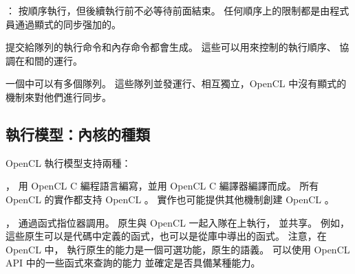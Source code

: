 \item {}：
按順序執行，但後續執行前不必等待前面結束。
任何順序上的限制都是由程式員通過顯式的同步强加的。
\stopigBase

提交給隊列的執行命令和內存命令都會生成。
這些可以用來控制的執行順序、
協調在和間的運行。

一個中可以有多個隊列。
這些隊列並發運行、相互獨立，OpenCL 中沒有顯式的機制來對他們進行同步。

\subsection{執行模型：內核的種類}

OpenCL 執行模型支持兩種：
\startigBase
\item {}，
用 OpenCL C 編程語言編寫，並用 OpenCL C 編譯器編譯而成。
所有 OpenCL 的實作都支持 OpenCL 。
實作也可能提供其他機制創建 OpenCL 。

\item {}，
通過函式指位器調用。
原生與 OpenCL 一起入隊在上執行，
並共享。
例如，這些原生可以是代碼中定義的函式，也可以是從庫中導出的函式。
注意，在 OpenCL 中，
執行原生的能力是一個可選功能，原生的語義。
可以使用 OpenCL API 中的一些函式來查詢的能力
並確定是否具備某種能力。
\stopigBase

